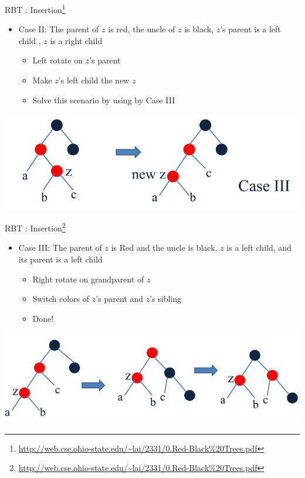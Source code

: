 \documentclass{beamer}
\begin{document}
\begin{frame}{RBT : Insertion\footnote{\url{http://web.cse.ohio-state.edu/~lai/2331/0.Red-Black\%20Trees.pdf}}}
    \begin{itemize}
        \item Case II: The parent of $z$ is red, the uncle of $z$ is black, $z$'s parent is a left child , $z$ is a right child
        \begin{itemize}
            \item Left rotate on $z$'s parent
            \item Make $z$'s left child the new $z$
            \item Solve this scenario by using by Case III
        \end{itemize}
    \end{itemize}
    \begin{center}
        \includegraphics[scale=0.4]{rbtInsertEg2.png}
    \end{center}
\end{frame}


\begin{frame}{RBT : Insertion\footnote{\url{http://web.cse.ohio-state.edu/~lai/2331/0.Red-Black\%20Trees.pdf}}}
    \begin{itemize}
        \item Case III: The parent of $z$ is Red and the uncle is black, $z$ is a left child, and its parent is a left child
        \begin{itemize}
            \item Right rotate on grandparent of $z$
            \item Switch colors of $z$'s parent and $z$'s sibling
            \item Done!
        \end{itemize}
    \end{itemize}
    \begin{center}
        \includegraphics[scale=0.38]{rbtInsertEg3.png}
    \end{center}
\end{frame}
\end{document}
